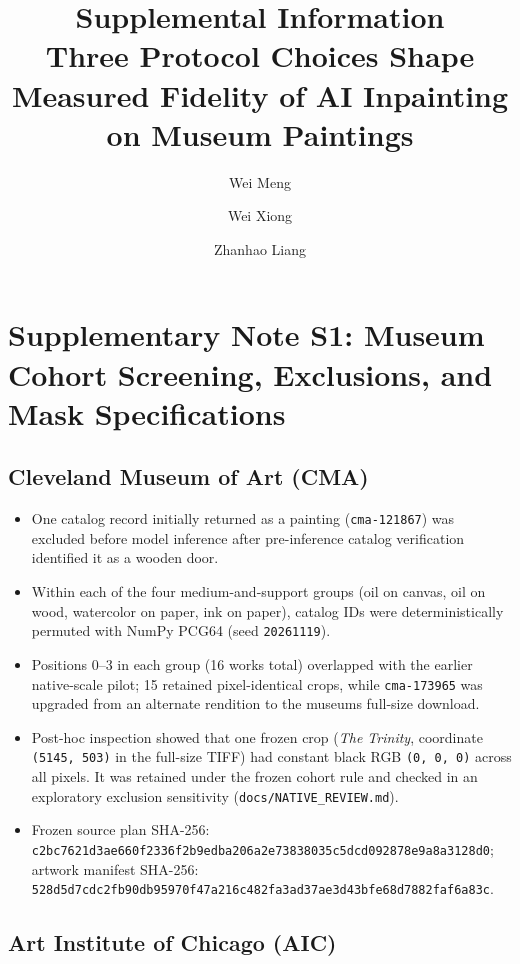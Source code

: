 \documentclass[11pt,a4paper]{article}
\title{\Large\bfseries Supplemental Information\\[.35em]\large\normalfont Three Protocol Choices Shape Measured Fidelity of AI Inpainting on Museum Paintings}
\author{Wei Meng \and Wei Xiong \and Zhanhao Liang}
\date{}
\providecommand{\tightlist}{\setlength{\itemsep}{0pt}\setlength{\parskip}{0pt}}
\begin{document}
\maketitle
\setcounter{secnumdepth}{0}
\section{Supplementary Note S1: Museum Cohort Screening, Exclusions, and Mask Specifications}\label{supplementary-note-s1-museum-cohort-screening-exclusions-and-mask-specifications}

\subsection{Cleveland Museum of Art (CMA)}\label{cleveland-museum-of-art-cma}

\begin{itemize}
\tightlist
\item
  One catalog record initially returned as a painting (\texttt{cma-121867}) was excluded before model inference after pre-inference catalog verification identified it as a wooden door.
\item
  Within each of the four medium-and-support groups (oil on canvas, oil on wood, watercolor on paper, ink on paper), catalog IDs were deterministically permuted with NumPy PCG64 (seed \texttt{20261119}).
\item
  Positions 0--3 in each group (16 works total) overlapped with the earlier native-scale pilot; 15 retained pixel-identical crops, while \texttt{cma-173965} was upgraded from an alternate rendition to the museum\textquotesingle s full-size download.
\item
  Post-hoc inspection showed that one frozen crop (\emph{The Trinity}, coordinate \texttt{(5145,\ 503)} in the full-size TIFF) had constant black RGB \texttt{(0,\ 0,\ 0)} across all pixels. It was retained under the frozen cohort rule and checked in an exploratory exclusion sensitivity (\nolinkurl{docs/NATIVE_REVIEW.md}).
\item
  Frozen source plan SHA-256: \nolinkurl{c2bc7621d3ae660f2336f2b9edba206a2e73838035c5dcd092878e9a8a3128d0}; artwork manifest SHA-256: \nolinkurl{528d5d7cdc2fb90db95970f47a216c482fa3ad37ae3d43bfe68d7882faf6a83c}.
\end{itemize}

\subsection{Art Institute of Chicago (AIC)}\label{art-institute-of-chicago-aic}
\end{document}
